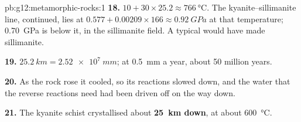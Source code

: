 \begin{solution}{pb:g12:metamorphic-rocks:1}
\textbf{18.} $10 + 30 \times 25.2 \approx \qty{766}{\celsius}$. The
kyanite--sillimanite line, continued, lies at $0.577 + 0.00209 \times 166
\approx \qty{0.92}{GPa}$ at that temperature; \qty{0.70}{GPa} is below it,
in the sillimanite field. A typical  would have made sillimanite.

\textbf{19.} $\qty{25.2}{km} = \qty{2.52e7}{mm}$; at \qty{0.5}{mm} a year,
about 50 million years.

\textbf{20.} As the rock rose it cooled, so its reactions slowed down, and
the water that the reverse reactions need had been driven off on the way
down.

\textbf{21.} The kyanite schist crystallised about \textbf{\qty{25}{km}
down}, at about \qty{600}{\celsius}.
\end{solution}
